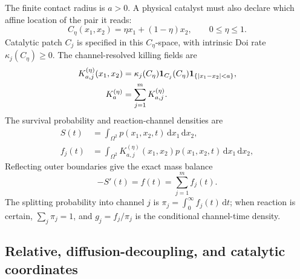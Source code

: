 \documentclass[aps,pre,reprint,amsmath,amssymb,longbibliography,floatfix]{revtex4-2}
\newcommand{\dd}{\mathrm d}
\begin{document}
The finite contact radius is \(a>0\). A physical catalyst must also declare
which affine location of the pair it reads:
\begin{equation}
C_\eta(x_1,x_2)=\eta x_1+(1-\eta)x_2,
\qquad 0\leq\eta\leq1.
\label{eq:catalytic-coordinate}
\end{equation}
Catalytic patch \(C_j\) is specified in this \(C_\eta\)-space, with intrinsic
Doi rate \(\kappa_j(C_\eta)\geq0\). The channel-resolved killing fields are
\begin{align}
K_{a,j}^{(\eta)}(x_1,x_2)
&=\kappa_j(C_\eta)\mathbf 1_{C_j}(C_\eta)
  \mathbf 1_{\{|x_1-x_2|<a\}},\notag\\
K_a^{(\eta)}&=\sum_{j=1}^m K_{a,j}^{(\eta)}.
\label{eq:doi-killing}
\end{align}
The survival probability and reaction-channel densities are
\begin{align}
S(t)&=\int_{\Omega^2}p(x_1,x_2,t)\,\dd x_1\,\dd x_2,\\
f_j(t)&=\int_{\Omega^2}K_{a,j}^{(\eta)}(x_1,x_2)
p(x_1,x_2,t)\,\dd x_1\,\dd x_2,
\label{eq:channel-flux}
\end{align}
Reflecting outer boundaries give the exact mass balance
\begin{equation}
-S'(t)=f(t)=\sum_{j=1}^m f_j(t).
\label{eq:mass-balance}
\end{equation}
The splitting probability into channel \(j\) is
\(\pi_j=\int_0^\infty f_j(t)\,\dd t\); when reaction is certain,
\(\sum_j\pi_j=1\), and \(g_j=f_j/\pi_j\) is the conditional channel-time
density.

\subsection{Relative, diffusion-decoupling, and catalytic coordinates}
\label{sec:coordinates}
\end{document}
